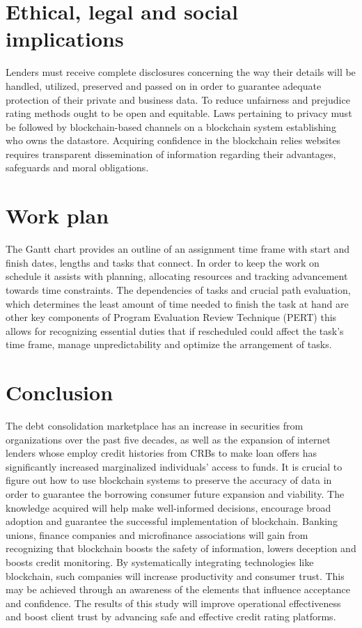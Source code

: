 \documentclass[a4paper]{article}
\begin{document}
\section{Ethical, legal and social implications}
Lenders must receive complete disclosures concerning the way their details will be handled, utilized, preserved and passed on in order to guarantee adequate protection of their private and business data. To reduce unfairness and prejudice rating methods ought to be open and equitable. Laws pertaining to privacy must be followed by blockchain-based channels on a blockchain system establishing who owns the datastore. Acquiring confidence in the blockchain relies websites requires transparent dissemination of information regarding their advantages, safeguards and moral obligations.

\section{Work plan}
The Gantt chart provides an outline of an assignment time frame with start and finish dates, lengths and tasks that connect. In order to keep the work on schedule it assists with planning, allocating resources and tracking advancement towards time constraints. The dependencies of tasks and crucial path evaluation, which determines the least amount of time needed to finish the task at hand are other key components of Program Evaluation Review Technique (PERT) this allows for recognizing essential duties that if rescheduled could affect the task's time frame, manage unpredictability and optimize the arrangement of tasks.

\section{Conclusion}
The debt consolidation marketplace has an increase in securities from organizations over the past five decades, as well as the expansion of internet lenders whose employ credit histories from CRBs to make loan offers has significantly increased marginalized individuals' access to funds. It is crucial to figure out how to use blockchain systems to preserve the accuracy of data in order to guarantee the borrowing consumer future expansion and viability. The knowledge acquired will help make well-informed decisions, encourage broad adoption and guarantee the successful implementation of blockchain. Banking unions, finance companies and microfinance associations will gain from recognizing that blockchain boosts the safety of information, lowers deception and boosts credit monitoring. By systematically integrating technologies like blockchain, such companies will increase productivity and consumer trust. This may be achieved through an awareness of the elements that influence acceptance and confidence. The results of this study will improve operational effectiveness and boost client trust by advancing safe and effective credit rating platforms.
\end{document}
